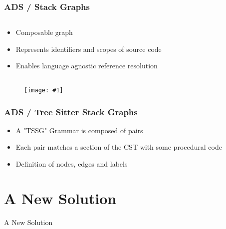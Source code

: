 \documentclass[dvipsnames, 10pt, table]{beamer}
\newcommand{\putimage}[2] {
  \begin{figure}[H]
    \centering
    \texttt{[image: \#1]}
	\end{figure}
}
\begin{document}
\begin{frame}[fragile]
  \frametitle{ADS / Stack Graphs}
  \begin{columns}
    \begin{column}{0.50\textwidth}
      \begin{itemize}
        \item Composable graph
        \item Represents identifiers and scopes of source code
        \item Enables language agnostic reference resolution
      \end{itemize}
    \end{column}
    \begin{column}{0.50\textwidth}
      
    \end{column}
  \end{columns}
  \putimage{figures/stack-graphs/stackgraph-example.png}{0.99}
\end{frame}

\begin{frame}[fragile]
  \frametitle{ADS / Tree Sitter Stack Graphs}
  \begin{itemize}
    \item A "TSSG" Grammar is composed of pairs
    \item Each pair matches a section of the CST with some procedural code
    \item Definition of nodes, edges and labels
  \end{itemize}
  
\end{frame}

\section{A New Solution}
\begin{frame}
  \centering
  \Huge
  A New Solution
\end{frame}
\end{document}
